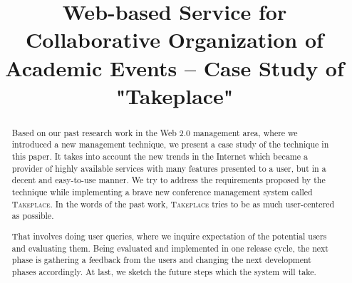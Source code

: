 \documentclass[conference]{IEEEtran}
\newcommand\tp{\textsc{Takeplace}\xspace}
\begin{document}
\title{Web-based Service for Collaborative Organization of Academic Events --
Case Study of "Takeplace"}

\author{
\and
{}
\and
{}
\and
{}
}

\sloppy
\maketitle

\begin{abstract}
Based on our past research work in the Web 2.0 management area, where we
introduced a new management technique, we present a case study of the
technique in this paper. It takes into account the new trends in the Internet
which became a provider of highly available services with many features
presented to a user, but in a decent and easy-to-use manner. We try to address
the requirements proposed by the technique while implementing a brave new
conference management system called \tp. In the words of the past work, \tp
tries to be as much user-centered as possible.

That involves doing user queries, where we inquire expectation of the
potential users and evaluating them. Being evaluated and implemented in one
release cycle, the next phase is gathering a feedback from the users and
changing the next development phases accordingly. At last, we sketch the
future steps which the system will take.
\end{abstract}
\end{document}
